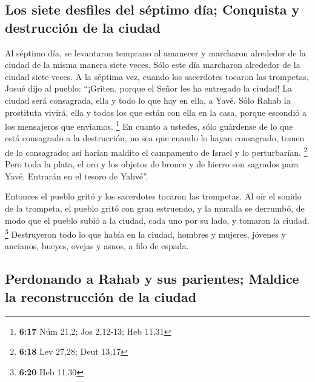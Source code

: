\hypertarget{los-siete-desfiles-del-suxe9ptimo-duxeda-conquista-y-destrucciuxf3n-de-la-ciudad}{%
\subsection{Los siete desfiles del séptimo día; Conquista y destrucción
de la
ciudad}\label{los-siete-desfiles-del-suxe9ptimo-duxeda-conquista-y-destrucciuxf3n-de-la-ciudad}}

 Al séptimo día, se levantaron temprano al amanecer y
marcharon alrededor de la ciudad de la misma manera siete veces. Sólo
este día marcharon alrededor de la ciudad siete veces.  A
la séptima vez, cuando los sacerdotes tocaron las trompetas, Josué dijo
al pueblo: ``¡Griten, porque el Señor les ha entregado la ciudad!
 La ciudad será consagrada, ella y todo lo que hay en
ella, a Yavé. Sólo Rahab la prostituta vivirá, ella y todos los que
están con ella en la casa, porque escondió a los mensajeros que
enviamos. \footnote{\textbf{6:17} Núm 21,2; Jos 2,12-13; Heb 11,31}
 En cuanto a ustedes, sólo guárdense de lo que está
consagrado a la destrucción, no sea que cuando lo hayan consagrado,
tomen de lo consagrado; así harían maldito el campamento de Israel y lo
perturbarían. \footnote{\textbf{6:18} Lev 27,28; Deut 13,17}
 Pero toda la plata, el oro y los objetos de bronce y de
hierro son sagrados para Yavé. Entrarán en el tesoro de Yahvé''.

 Entonces el pueblo gritó y los sacerdotes tocaron las
trompetas. Al oír el sonido de la trompeta, el pueblo gritó con gran
estruendo, y la muralla se derrumbó, de modo que el pueblo subió a la
ciudad, cada uno por su lado, y tomaron la ciudad. \footnote{\textbf{6:20}
  Heb 11,30}  Destruyeron todo lo que había en la ciudad,
hombres y mujeres, jóvenes y ancianos, bueyes, ovejas y asnos, a filo de
espada.

\hypertarget{perdonando-a-rahab-y-sus-parientes-maldice-la-reconstrucciuxf3n-de-la-ciudad}{%
\subsection{Perdonando a Rahab y sus parientes; Maldice la
reconstrucción de la
ciudad}\label{perdonando-a-rahab-y-sus-parientes-maldice-la-reconstrucciuxf3n-de-la-ciudad}}

